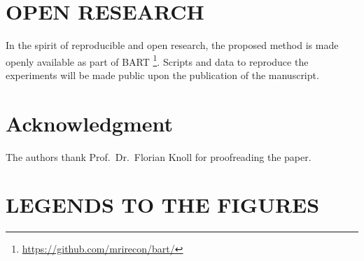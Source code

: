 \documentclass[a4paper,11pt]{article}
\begin{document}
\section*{OPEN RESEARCH}

In the spirit of reproducible and open research, 
the proposed method is made openly available as part of BART 
\footnote{\url{https://github.com/mrirecon/bart/}}.
Scripts and data to reproduce the experiments will be made public 
upon the publication of the manuscript.

\section*{Acknowledgment}

The authors thank Prof.~Dr.~Florian Knoll for proofreading the paper.

\vfill
\pagebreak



\vfill
\pagebreak

\section*{LEGENDS TO THE FIGURES}
\end{document}
